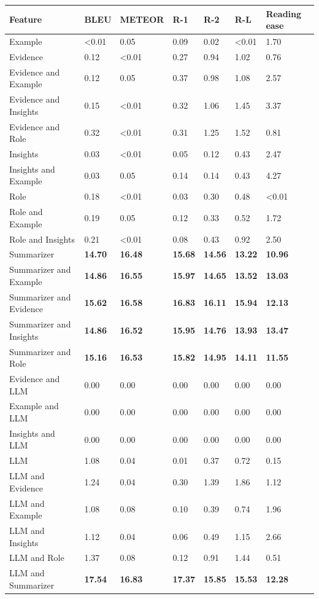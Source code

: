 \begin{tabular}{|l|l|l|l|l|l|l|}
\hline
\textbf{Feature} & BLEU & METEOR & R-1 & R-2 & R-L & Reading ease \\
 \hline
 Example & \textless{}0.01 & 0.05 & 0.09 & 0.02 & \textless{}0.01 & 1.70 \\
 \hline
 Evidence & 0.12 & \textless{}0.01 & 0.27 & 0.94 & 1.02 & 0.76 \\
 \hline
 Evidence and Example & 0.12 & 0.05 & 0.37 & 0.98 & 1.08 & 2.57 \\
 \hline
 Evidence and Insights & 0.15 & \textless{}0.01 & 0.32 & 1.06 & 1.45 & 3.37 \\
 \hline
 Evidence and Role & 0.32 & \textless{}0.01 & 0.31 & 1.25 & 1.52 & 0.81 \\
 \hline
 Insights & 0.03 & \textless{}0.01 & 0.05 & 0.12 & 0.43 & 2.47 \\
 \hline
 Insights and Example & 0.03 & 0.05 & 0.14 & 0.14 & 0.43 & 4.27 \\
 \hline
 Role & 0.18 & \textless{}0.01 & 0.03 & 0.30 & 0.48 & \textless{}0.01 \\
 \hline
 Role and Example & 0.19 & 0.05 & 0.12 & 0.33 & 0.52 & 1.72 \\
 \hline
 Role and Insights & 0.21 & \textless{}0.01 & 0.08 & 0.43 & 0.92 & 2.50 \\
 \hline
 Summarizer & \textbf{14.70} & \textbf{16.48} & \textbf{15.68} & \textbf{14.56} & \textbf{13.22} & \textbf{10.96} \\
 \hline
 Summarizer and Example & \textbf{14.86} & \textbf{16.55} & \textbf{15.97} & \textbf{14.65} & \textbf{13.52} & \textbf{13.03} \\
 \hline
 Summarizer and Evidence & \textbf{15.62} & \textbf{16.58} & \textbf{16.83} & \textbf{16.11} & \textbf{15.94} & \textbf{12.13} \\
 \hline
 Summarizer and Insights & \textbf{14.86} & \textbf{16.52} & \textbf{15.95} & \textbf{14.76} & \textbf{13.93} & \textbf{13.47} \\
 \hline
 Summarizer and Role & \textbf{15.16} & \textbf{16.53} & \textbf{15.82} & \textbf{14.95} & \textbf{14.11} & \textbf{11.55} \\
 \hline
 Evidence and LLM & 0.00 & 0.00 & 0.00 & 0.00 & 0.00 & 0.00 \\
 \hline
 Example and LLM & 0.00 & 0.00 & 0.00 & 0.00 & 0.00 & 0.00 \\
 \hline
 Insights and LLM & 0.00 & 0.00 & 0.00 & 0.00 & 0.00 & 0.00 \\
 \hline
 LLM & 1.08 & 0.04 & 0.01 & 0.37 & 0.72 & 0.15 \\
 \hline
 LLM and Evidence & 1.24 & 0.04 & 0.30 & 1.39 & 1.86 & 1.12 \\
 \hline
 LLM and Example & 1.08 & 0.08 & 0.10 & 0.39 & 0.74 & 1.96 \\
 \hline
 LLM and Insights & 1.12 & 0.04 & 0.06 & 0.49 & 1.15 & 2.66 \\
 \hline
 LLM and Role & 1.37 & 0.08 & 0.12 & 0.91 & 1.44 & 0.51 \\
 \hline
 LLM and Summarizer & \textbf{17.54} & \textbf{16.83} & \textbf{17.37} & \textbf{15.85} & \textbf{15.53} & \textbf{12.28} \\
\hline
\end{tabular}
